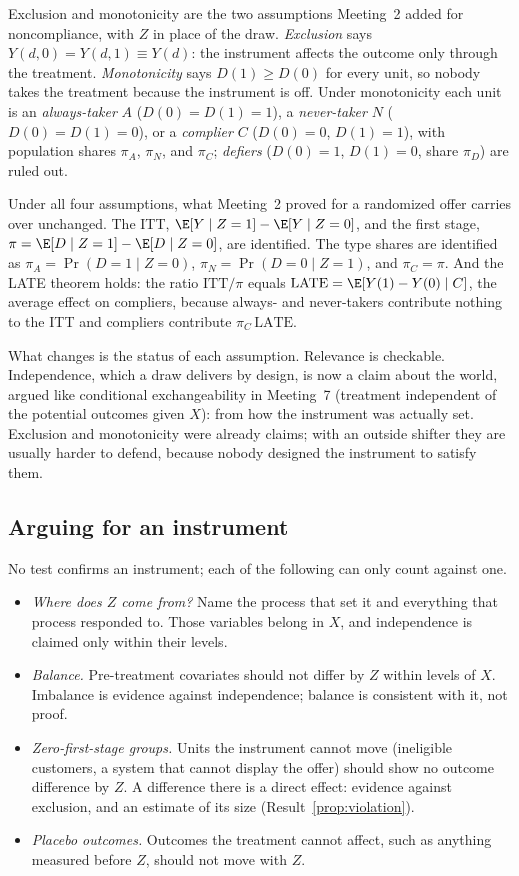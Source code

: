 \documentclass[11pt]{article}
\begin{document}
Exclusion and monotonicity are the two assumptions Meeting~2 added for noncompliance, with $Z$ in place of the draw.
\emph{Exclusion} says $Y(d, 0) = Y(d, 1) \equiv Y(d)$: the instrument affects the outcome only through the treatment.
\emph{Monotonicity} says $D(1) \ge D(0)$ for every unit, so nobody takes the treatment because the instrument is off. Under
monotonicity each unit is an \emph{always-taker} $A$ ($D(0) = D(1) = 1$), a \emph{never-taker} $N$ ($D(0) = D(1) = 0$), or a
\emph{complier} $C$ ($D(0) = 0$, $D(1) = 1$), with population shares $\pi_A$, $\pi_N$, and $\pi_C$; \emph{defiers} ($D(0) = 1$,
$D(1) = 0$, share $\pi_D$) are ruled out.

Under all four assumptions, what Meeting~2 proved for a randomized offer carries over unchanged. The ITT, $\E[Y \mid Z=1] - \E[Y \mid Z=0]$, and the
first stage, $\pi = \E[D \mid Z=1] - \E[D \mid Z=0]$, are identified. The type shares are identified as
$\pi_A = \Pr(D=1 \mid Z=0)$, $\pi_N = \Pr(D=0 \mid Z=1)$, and $\pi_C = \pi$. And the LATE theorem holds: the ratio
$\text{ITT}/\pi$ equals $\text{LATE} = \E[Y(1) - Y(0) \mid C]$, the average effect on compliers, because always- and
never-takers contribute nothing to the ITT and compliers contribute $\pi_C\,\text{LATE}$.

What changes is the status of each assumption. Relevance is checkable. Independence, which a draw delivers by design, is now a
claim about the world, argued like conditional exchangeability in Meeting~7 (treatment independent of the potential outcomes
given $X$): from how the instrument was actually set. Exclusion and monotonicity were already claims; with an outside shifter
they are usually harder to defend, because nobody designed the instrument to satisfy them.

\subsection{Arguing for an instrument}

No test confirms an instrument; each of the following can only count against one.
\begin{itemize}
  \item \emph{Where does $Z$ come from?} Name the process that set it and everything that process responded to. Those
  variables belong in $X$, and independence is claimed only within their levels.
  \item \emph{Balance.} Pre-treatment covariates should not differ by $Z$ within levels of $X$. Imbalance is evidence against
  independence; balance is consistent with it, not proof.
  \item \emph{Zero-first-stage groups.} Units the instrument cannot move (ineligible customers, a system that cannot display
  the offer) should show no outcome difference by $Z$. A difference there is a direct effect: evidence against exclusion,
  and an estimate of its size (Result~\ref{prop:violation}).
  \item \emph{Placebo outcomes.} Outcomes the treatment cannot affect, such as anything measured before $Z$, should not move with $Z$.
\end{itemize}
\end{document}
